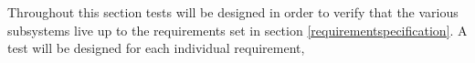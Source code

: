 
Throughout this section tests will be designed in order to verify that the various subsystems live up to the requirements set in section \ref{requirementspecification}.
A test will be designed for each individual requirement, 



